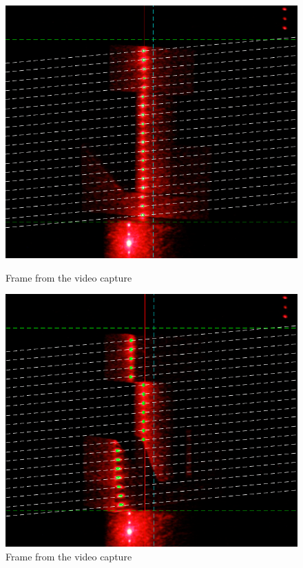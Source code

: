 \begin{figure}[H]
    \centering
    \begin{minipage}[t]{0.48\textwidth}
        \centering
        \includegraphics[width=1.0\textwidth]{figures/reconstruction/woodepilines1_crop.png}
        \caption{Frame from the video capture}
    \label{fig:woodepilines1}
    \end{minipage}%
    \hspace{.03\textwidth}
    \begin{minipage}[t]{0.48\textwidth}
        \centering
        \includegraphics[width=1.0\textwidth]{figures/reconstruction/woodepilines2_crop.png}
        \caption{Frame from the video capture}
        \label{fig:woodepilines2}
    \end{minipage}
\end{figure}

